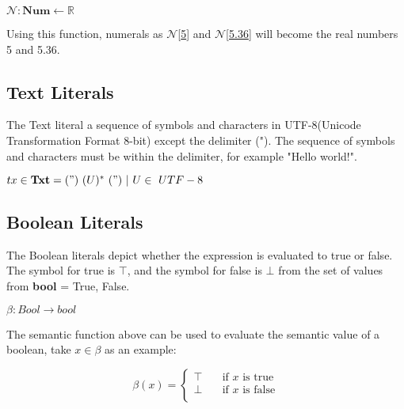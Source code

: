   \begin{math}
  \mathcal{N}: \textbf{Num} \leftarrow \mathbb{R}
  \end{math}
  
  Using this function, numerals as 
  \begin{math}
    \mathcal{N}
  \end{math}[\underline{5}] and 
  \begin{math}
    \mathcal{N}
  \end{math}[\underline{5.36}] will become the real numbers 5 and 5.36. 
  
  
  \subsection{Text Literals}
  The Text literal a sequence of symbols and characters in UTF-8(Unicode Transformation Format 8-bit) except the delimiter ("). The sequence of symbols and characters must be within the delimiter, for example "Hello world!".
  
  \begin{math}
  tx \in \textbf{Txt} = (") \ (U)^* \ (")\ |\ U \in \ {UTF-8}
  \end{math}
  
  \subsection{Boolean Literals}
  The Boolean literals depict whether the expression is evaluated to true or false. The symbol for true is \begin{math} \top \end{math}, and the symbol for false is \begin{math} \bot \end{math} from the set of values from \textbf{bool} = {True, False}.
  
  \begin{math}
  	\beta : Bool \rightarrow bool
  \end{math}
  
  The semantic function above can be used to evaluate the semantic value of a boolean, take \begin{math} x \in \beta  \end{math} as an example:
  
  \[ \beta(x) =
    \begin{cases}
      \top       & \quad \text{if } x \text{ is true}\\
      \bot  & \quad \text{if } x \text{ is false}\\
    \end{cases}
  \]
  
